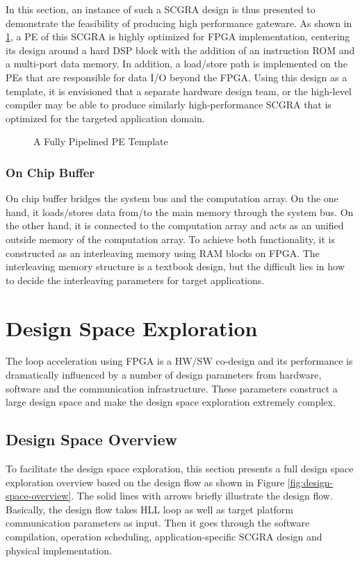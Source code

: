 \documentclass[12pt]{article} %
\begin{document}
In this section, an instance of such a SCGRA design is thus presented to demonstrate the feasibility 
of producing high performance gateware. As shown in \ref{fig:pe}, a PE of this SCGRA is highly optimized 
for FPGA implementation, centering its design around a hard DSP block with the addition of
an instruction ROM and a multi-port data memory. In addition, a load/store path is implemented on
the PEs that are responsible for data I/O beyond the FPGA. Using this design as a template, it is
envisioned that a separate hardware design team, or the high-level compiler may be able to produce
similarly high-performance SCGRA that is optimized for the targeted application domain.

\begin{figure}[H]
\center{\texttt{[image: pe]}}
\caption{A Fully Pipelined PE Template}
\label{fig:pe}
\end{figure}

\subsubsection{On Chip Buffer}
On chip buffer bridges the system bus and the computation array. On the one hand, it loads/stores
data from/to the main memory through the system bus. On the other hand, it is connected to the
computation array and acts as an unified outside memory of the computation array. To achieve both
functionality, it is constructed as an interleaving memory using RAM blocks on FPGA. The
interleaving memory structure is a textbook design, but the difficult lies in how to decide the
interleaving parameters for target applications.

\section{Design Space Exploration}
The loop acceleration using FPGA is a HW/SW co-design and its performance is dramatically influenced by
a number of design parameters from hardware, software and the communication infrastructure. These
parameters construct a large design space and make the design space exploration extremely complex. 

\subsection{Design Space Overview}
To facilitate the design space exploration, this section presents a full design space exploration
overview based on the design flow as shown in Figure \ref{fig:design-space-overview}. The solid
lines with arrows briefly illustrate the design flow. Basically, the design flow takes HLL loop 
as well as target platform communication parameters as input. Then it goes through the software 
compilation, operation scheduling, application-specific SCGRA design and physical implementation. 
\end{document}
